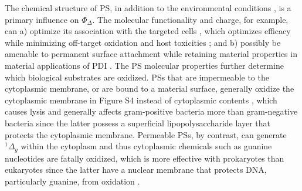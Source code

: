 The chemical structure of PS, in addition to the environmental conditions \cite{Kruk1998PhotophysicsLuminescence,Kullmann2012UltrafastBisporphyrin}, is a primary influence on $\Phi_{\Delta}$. The molecular functionality and charge, for example, can a) optimize its association with the targeted cells \cite{VanDerWal1997DeterminationBacteria,Dickson1989CellSurfaces}, which optimizes efficacy while minimizing off-target oxidation \cite{Lambrechts2005PhotodynamicMice} and host toxicities \cite{Quishida2016PhotodynamicLight}; and b) possibly be amenable to permanent surface attachment \cite{Ringot2009Porphyrin-graftedReaction} while retaining material properties \cite{McCoy2014PhotodynamicControl} in material applications of PDI \cite{Peddinti2018PhotodynamicThreat,Gottenbos2001AntimicrobialBacteria}. The PS molecular properties further determine which biological substrates are oxidized. PSs that are impermeable to the cytoplasmic membrane, or are bound to a material surface, generally oxidize the cytoplasmic membrane \cite{Specht1990DepolarizationAction,Ehrenberg1993ElectricAlterations} in Figure S4 instead of cytoplasmic contents \cite{Maisch2004AntibacterialDermatology}, which causes lysis \cite{Sahu2009AtomicColi,Bertoloni1987RoleCells} and generally affects gram-positive bacteria more than gram-negative bacteria \cite{Lauro2002PhotoinactivationConjugates,Merchat1996Meso-substitutedBacteria} since the latter possess a superficial lipopolysaccharide layer that protects the cytoplasmic membrane. Permeable PSs, by contrast, can generate $^1\Delta_g$ within the cytoplasm and thus cytoplasmic chemicals \cite{Bagchi1979RoleAcriflavine} such as guanine nucleotides \cite{Prat1997Determination9,Devasagayam1991FormationOxygen} are fatally oxidized, which is more effective with prokaryotes than eukaryotes \cite{Quishida2016PhotodynamicLight} since the latter have a nuclear membrane that protects DNA, particularly guanine, from oxidation \cite{Pereira2013PhotodynamicVitro}.

